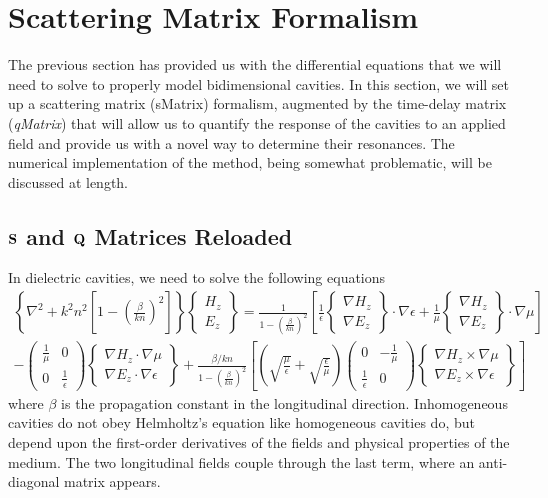 \section{Scattering Matrix Formalism}
The previous section has provided us with the differential equations that 
we will need to solve to properly model bidimensional cavities. In this section, 
we will set up a scattering matrix (\gls{sMatrix}) formalism, augmented by the
time-delay matrix (\textit{\gls{qMatrix}})
that will allow us to quantify the response of the cavities
to an applied field and provide us with a novel way to determine their resonances. 
The numerical implementation of the method, being somewhat problematic, will 
be discussed at length. 

\subsection{$\mathbf{S}$ and $\mathbf{Q}$ Matrices Reloaded}
In dielectric cavities, we need to solve the following equations
  \begin{multline}
    \left\{\nabla^2+k^2n^2\left[1-\left(\frac{\beta}{kn}\right)^2\right]\right\}\begin{Bmatrix} H_z \\ E_z \end{Bmatrix}
      = \frac{1}{1-\left(\frac{\beta}{kn}\right)^2}
	  \left[\frac{1}{\epsilon}\begin{Bmatrix} \nabla H_z \\ \nabla E_z \end{Bmatrix}\cdot\nabla\epsilon+\frac{1}{\mu}\begin{Bmatrix} \nabla  H_z \\ \nabla E_z \end{Bmatrix}\cdot\nabla\mu\right]
      \\-\begin{pmatrix} \frac{1}{\mu} & 0 \\ 0 &\frac{1}{\epsilon}\end{pmatrix} \begin{Bmatrix} \nabla H_z \cdot\nabla\mu \\ \nabla E_z\cdot\nabla\epsilon \end{Bmatrix}
      +\frac{\beta/kn}{1-\left(\frac{\beta}{kn}\right)^2}\left[\left(\sqrt{\frac{\mu}{\epsilon}}+\sqrt{\frac{\epsilon}{\mu}}\right)\begin{pmatrix}0 & -\frac{1}{\mu}\\\frac{1}{\epsilon} & 0\end{pmatrix}
      \begin{Bmatrix} \nabla H_z\times\nabla\mu \\ \nabla E_z\times\nabla\epsilon\end{Bmatrix}\right]
  \end{multline}
where $\beta$ is the propagation constant in the longitudinal direction.
Inhomogeneous cavities do not obey Helmholtz's equation like homogeneous
cavities do, but depend upon the first-order derivatives of the fields and 
physical properties of the medium. The two longitudinal fields
couple through the last term, where an anti-diagonal matrix appears.


